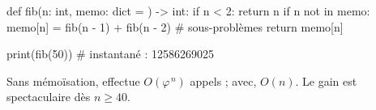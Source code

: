\begin{python}
def fib(n: int, memo: dict = {}) -> int:
    if n < 2:
        return n
    if n not in memo:
        memo[n] = fib(n - 1) + fib(n - 2)   # sous-problèmes
    return memo[n]

print(fib(50))   # instantané : 12586269025
\end{python}

\begin{retenir}
Sans mémoïsation,  effectue $O(\varphi^{\,n})$ appels ;
avec, $O(n)$. Le gain est spectaculaire dès $n \geq 40$.
\end{retenir}
